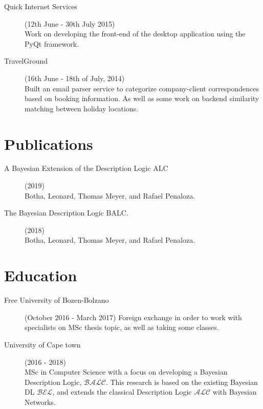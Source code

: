 \documentclass[margin,line,a4paper]{resume}
\begin{document}
\begin{resume}
\begin{description}
                \item[Quick Internet Services] (12th June - 30th July 2015) \\
                    Work on developing the front-end of the desktop application using the PyQt framework.

                \item[TravelGround] (16th June - 18th of July, 2014) \\
                    Built an email parser service to categorize company-client correspondences based on booking information. As well as some work on backend similarity matching between holiday locations.

            \end{description}

        \section{\mysidestyle Publications}    
            \begin{description}
                \item[A Bayesian Extension of the Description Logic ALC] (2019)\\ 
                    Botha, Leonard, Thomas Meyer, and Rafael Penaloza. 

                \item[The Bayesian Description Logic BALC.] (2018)\\ 
                    Botha, Leonard, Thomas Meyer, and Rafael Penaloza.
            \end{description}

        \section{\mysidestyle Education}
            \begin{description}
                \item[Free University of Bozen-Bolzano] (October 2016 - March 2017)
                    Foreign exchange in order to work with specialists on MSc thesis topic, as well as taking some classes.

                \item[University of Cape town] (2016 - 2018)\\
                    MSc in Computer Science with a focus on developing a Bayesian Description Logic, $\mathcal{BALC}$. This research is based on the existing Bayesian DL $\mathcal{BEL}$, and extends the classical Description Logic $\mathcal{ALC}$ with Bayesian Networks.


\end{description}
\end{resume}
\end{document}
